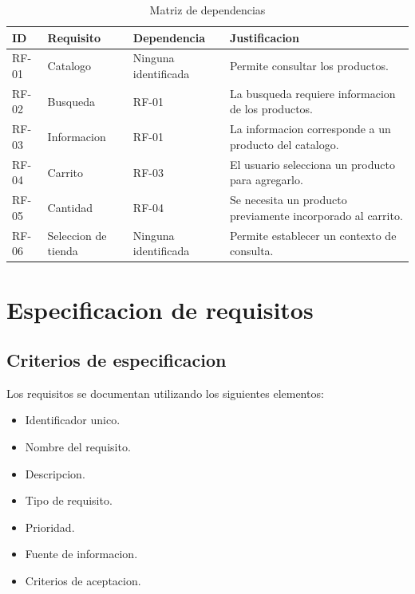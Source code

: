\documentclass[11pt,a4paper]{article}
\begin{document}
\begin{table}[H]
\centering
\caption{Matriz de dependencias}
\small
\begin{tabularx}{\textwidth}{p{2cm}p{3cm}YY}
\toprule
\textbf{ID} &
\textbf{Requisito} &
\textbf{Dependencia} &
\textbf{Justificacion} \\
\midrule

RF-01 &
Catalogo &
Ninguna identificada &
Permite consultar los productos. \\

RF-02 &
Busqueda &
RF-01 &
La busqueda requiere informacion
de los productos. \\

RF-03 &
Informacion &
RF-01 &
La informacion corresponde a un
producto del catalogo. \\

RF-04 &
Carrito &
RF-03 &
El usuario selecciona un producto
para agregarlo. \\

RF-05 &
Cantidad &
RF-04 &
Se necesita un producto previamente
incorporado al carrito. \\

RF-06 &
Seleccion de tienda &
Ninguna identificada &
Permite establecer un contexto
de consulta. \\

\bottomrule
\end{tabularx}
\end{table}

\section{Especificacion de requisitos}

\subsection{Criterios de especificacion}

Los requisitos se documentan utilizando los
siguientes elementos:

\begin{itemize}
    \item Identificador unico.
    \item Nombre del requisito.
    \item Descripcion.
    \item Tipo de requisito.
    \item Prioridad.
    \item Fuente de informacion.
    \item Criterios de aceptacion.
\end{itemize}
\end{document}
